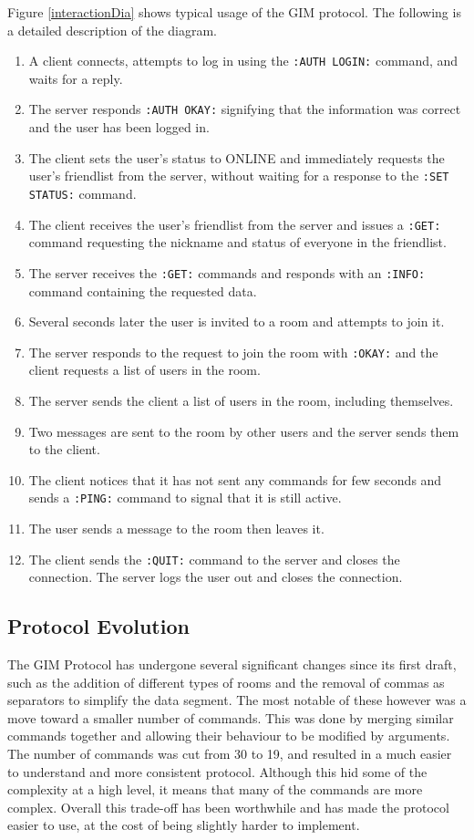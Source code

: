 Figure \ref{interactionDia} shows typical usage of the GIM protocol. The following is a detailed description of the diagram.
\begin{enumerate}
\item{A client connects, attempts to log in using the \texttt{:AUTH LOGIN:} command, and waits for a reply.}
\item{The server responds \texttt{:AUTH OKAY:} signifying that the information was correct and the user has been logged in.}
\item{The client sets the user's status to ONLINE and immediately requests the user's friendlist from the server, without waiting for a response to the \texttt{:SET STATUS:} command.}
\item{The client receives the user's friendlist from the server and issues a \texttt{:GET:} command requesting the nickname and status of everyone in the friendlist.}
\item{The server receives the \texttt{:GET:} commands and responds with an \texttt{:INFO:} command containing the requested data.}
\item{Several seconds later the user is invited to a room and attempts to join it.}
\item{The server responds to the request to join the room with \texttt{:OKAY:} and the client requests a list of users in the room.}
\item{The server sends the client a list of users in the room, including themselves.}
\item{Two messages are sent to the room by other users and the server sends them to the client.}
\item{The client notices that it has not sent any commands for few seconds and sends a \texttt{:PING:} command to signal that it is still active.}
\item{The user sends a message to the room then leaves it.}
\item{The client sends the \texttt{:QUIT:} command to the server and closes the connection. The server logs the user out and closes the connection.}
\end{enumerate}


\subsection{Protocol Evolution}
\label{protocol_evol}

The GIM Protocol has undergone several significant changes since its first draft, such as the addition of different types of rooms and the removal of commas as separators to simplify the data segment. The most notable of these however was a move toward a smaller number of commands. This was done by merging similar commands together and allowing their behaviour to be modified by arguments. The number of commands was cut from 30 to 19, and resulted in a much easier to understand and more consistent protocol. Although this hid some of the complexity at a high level, it means that many of the commands are more complex. Overall this trade-off has been worthwhile and has made the protocol easier to use, at the cost of being slightly harder to implement.

